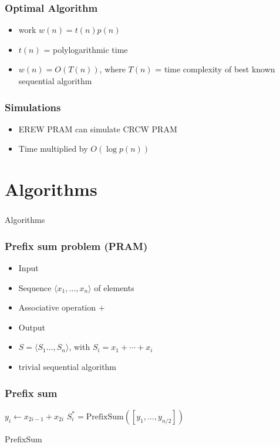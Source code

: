 \documentclass[14pt]{beamer}
\begin{document}
\begin{frame}\frametitle{Optimal Algorithm}
\begin{itemize}
\item
  \alert{work} $w(n) = t(n) p(n)$
\item
  $t(n)$ = polylogarithmic time
\item
  $w(n) = O(T(n))$, where $T(n)$ = time complexity of \alert{best known}
  sequential algorithm
\end{itemize}
\end{frame}


\begin{frame}\frametitle{Simulations}
\begin{itemize}
\item
  EREW PRAM can simulate CRCW PRAM
\item
  Time multiplied by $O(\log p(n))$
\end{itemize}
\end{frame}




\section{Algorithms}


\begin{frame}\frametitle{}
  \begin{center}
    \Huge
    Algorithms
  \end{center}
\end{frame}

\begin{frame}\frametitle{Prefix sum problem (PRAM)}
  \begin{itemize}
  \item
    Input
  \item
    Sequence $\langle x_{1}, \ldots , x_{n} \rangle$ of elements
  \item
    Associative operation $+$
  \item
    Output
  \item
     $S=\langle S_{1}  \ldots , S_{n} \rangle$, with $S_{i} = x_{1} +
     \cdots + x_{i}$
   \item
     trivial sequential algorithm
  \end{itemize}
\end{frame}

\begin{frame}\frametitle{Prefix sum}
\begin{algorithm}[H]

{
  $y_{i}\gets x_{2i-1} + x_{2i}$\;
}
$S^{*}_{i} = \text{PrefixSum}([y_{1}, \ldots , y_{n/2}])$\;
{
}
\caption{PrefixSum}
\end{algorithm}
\end{frame}
\end{document}

